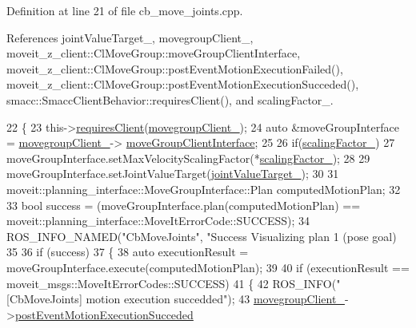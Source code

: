 Definition at line 21 of file cb\+\_\+move\+\_\+joints.\+cpp.



References joint\+Value\+Target\+\_\+, movegroup\+Client\+\_\+, moveit\+\_\+z\+\_\+client\+::\+Cl\+Move\+Group\+::move\+Group\+Client\+Interface, moveit\+\_\+z\+\_\+client\+::\+Cl\+Move\+Group\+::post\+Event\+Motion\+Execution\+Failed(), moveit\+\_\+z\+\_\+client\+::\+Cl\+Move\+Group\+::post\+Event\+Motion\+Execution\+Succeded(), smacc\+::\+Smacc\+Client\+Behavior\+::requires\+Client(), and scaling\+Factor\+\_\+.


\begin{DoxyCode}
22 \{
23     this->\hyperlink{classsmacc_1_1SmaccClientBehavior_a917f001e763a1059af337bf4e164f542}{requiresClient}(\hyperlink{classmoveit__z__client_1_1CbMoveJoints_a2ce2e613b676025766dcd2f01ae50810}{movegroupClient\_});
24     \textcolor{keyword}{auto} &moveGroupInterface = \hyperlink{classmoveit__z__client_1_1CbMoveJoints_a2ce2e613b676025766dcd2f01ae50810}{movegroupClient\_}->
      \hyperlink{classmoveit__z__client_1_1ClMoveGroup_af86e046b837be0ef4afa9893d8808f20}{moveGroupClientInterface};
25 
26     \textcolor{keywordflow}{if}(\hyperlink{classmoveit__z__client_1_1CbMoveJoints_aadb5410711e277fab3a637cb4835fb3b}{scalingFactor\_})
27         moveGroupInterface.setMaxVelocityScalingFactor(*\hyperlink{classmoveit__z__client_1_1CbMoveJoints_aadb5410711e277fab3a637cb4835fb3b}{scalingFactor\_});
28         
29     moveGroupInterface.setJointValueTarget(\hyperlink{classmoveit__z__client_1_1CbMoveJoints_a0f52577dd2fccf25f36c4c93e733c0f4}{jointValueTarget\_});
30 
31     moveit::planning\_interface::MoveGroupInterface::Plan computedMotionPlan;
32 
33     \textcolor{keywordtype}{bool} success = (moveGroupInterface.plan(computedMotionPlan) == 
      moveit::planning\_interface::MoveItErrorCode::SUCCESS);
34     ROS\_INFO\_NAMED(\textcolor{stringliteral}{"CbMoveJoints"}, \textcolor{stringliteral}{"Success Visualizing plan 1 (pose goal) %
35 
36     \textcolor{keywordflow}{if} (success)
37     \{
38         \textcolor{keyword}{auto} executionResult = moveGroupInterface.execute(computedMotionPlan);
39 
40         \textcolor{keywordflow}{if} (executionResult == moveit\_msgs::MoveItErrorCodes::SUCCESS)
41         \{
42             ROS\_INFO(\textcolor{stringliteral}{"[CbMoveJoints] motion execution succedded"});
43             \hyperlink{classmoveit__z__client_1_1CbMoveJoints_a2ce2e613b676025766dcd2f01ae50810}{movegroupClient\_}->\hyperlink{classmoveit__z__client_1_1ClMoveGroup_ad6b8f0acbe3d11b5c39a83911a3d95b8}{postEventMotionExecutionSucceded}
}
\end{DoxyCode}
